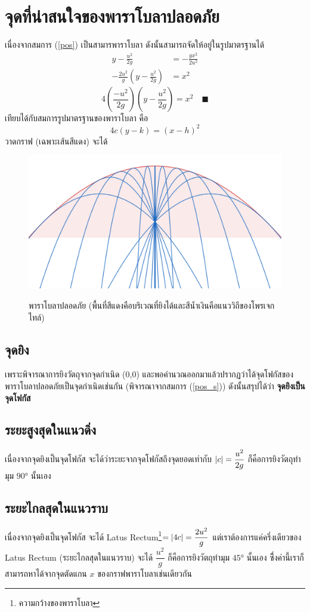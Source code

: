 \documentclass[a4paper,12pt]{article}
\begin{document}
	\section{จุดที่น่าสนใจของพาราโบลาปลอดภัย}
	เนื่องจากสมการ (\ref{pos}) เป็นสามารพาราโบลา ดังนั้นสามารถจัดให้อยู่ในรูปมาตรฐานได้
	\begin{align*}
	y-\frac{u^2}{2g}&=-\frac{gx^2}{2u^2}\\
	-\frac{2u^2}{g}\left(y-\frac{u^2}{2g}\right)&=x^2
	\end{align*}
	\begin{equation}\label{pos_s}
	4\left(\frac{-u^2}{2g}\right)\left(y-\frac{u^2}{2g}\right)=x^2\quad\blacksquare
	\end{equation}
	เทียบได้กับสมการรูปมาตรฐานของพาราโบลา คือ
	$$4c(y-k)=(x-h)^2$$
\pagebreak
	วาดกราฟ (เฉพาะเส้นสีแดง) จะได้
	\begin{figure}[h]
		\centering
		\includegraphics[width=1\linewidth]{pos_s3}	
		\label{fig:ps_s}
		\caption{พาราโบลาปลอดภัย (พื้นที่สีแดงคือบริเวณที่ยิงได้และสีน้ำเงินคือแนววิถีของโพรเจกไทล์)}
	\end{figure}
	\subsection{จุดยิง}
	เพราะพิจารณาการยิงวัตถุจากจุดกำเนิด (0,0) และพอคำนวณออกมาแล้วปรากฏว่าได้จุดโฟกัสของพาราโบลาปลอดภัยเป็นจุดกำเนิดเช่นกัน (พิจารณาจากสมการ (\ref{pos_s})) ดังนั้นสรุปได้ว่า \textbf{จุดยิงเป็นจุดโฟกัส}
	\subsection{ระยะสูงสุดในแนวดิ่ง}
	เนื่องจากจุดยิงเป็นจุดโฟกัส จะได้ว่าระยะจากจุดโฟกัสถึงจุดยอดเท่ากับ $\abs{c}=\dfrac{u^2}{2g}$ ก็คือการยิงวัตถุทำมุม $90\si{\degree}$ นั้นเอง
	\subsection{ระยะไกลสุดในแนวราบ}
	เนื่องจากจุดยิงเป็นจุดโฟกัส จะได้ Latus Rectum\footnote{ความกว้างของพาราโบลา}$=\abs{4c}=\dfrac{2u^2}{g}$ แต่เราต้องการแค่ครึ่งเดียวของ Latus Rectum (ระยะไกลสุดในแนวราบ) จะได้ $\dfrac{u^2}{g}$ ก็คือการยิงวัตถุทำมุม $45\si{\degree}$ นั้นเอง ซึึ่งค่านี้เราก็สามารถหาได้จากจุดตัดแกน $x$ ของกราฟพาราโบลาเช่นเดียวกัน
\end{document}
